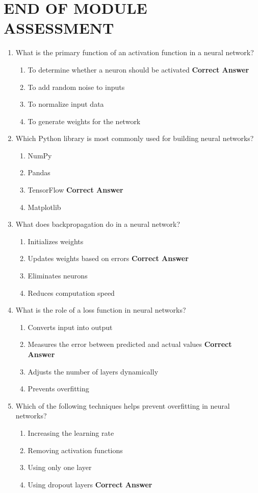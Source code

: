 \documentclass[12pt,a4paper]{article}
\begin{document}
\section{END OF MODULE ASSESSMENT}
\begin{enumerate}
\item What is the primary function of an activation function in a neural network?
\begin{enumerate}[label=\Alph*).]
\item To determine whether a neuron should be activated \textbf{Correct Answer}
\item To add random noise to inputs
\item To normalize input data
\item To generate weights for the network
\end{enumerate}
\item Which Python library is most commonly used for building neural networks?
\begin{enumerate}[label=\Alph*).]
\item NumPy
\item Pandas
\item TensorFlow \textbf{Correct Answer}
\item Matplotlib
\end{enumerate}
\item What does backpropagation do in a neural network?
\begin{enumerate}[label=\Alph*).]
\item Initializes weights
\item Updates weights based on errors \textbf{Correct Answer}
\item Eliminates neurons
\item Reduces computation speed
\end{enumerate}
\item What is the role of a loss function in neural networks?
\begin{enumerate}[label=\Alph*).]
\item Converts input into output
\item Measures the error between predicted and actual values \textbf{Correct Answer}
\item Adjusts the number of layers dynamically
\item Prevents overfitting
\end{enumerate}
\item Which of the following techniques helps prevent overfitting in neural networks?
\begin{enumerate}[label=\Alph*).]
\item Increasing the learning rate
\item Removing activation functions
\item Using only one layer
\item Using dropout layers \textbf{Correct Answer}
\end{enumerate}
\end{enumerate}
\end{document}
